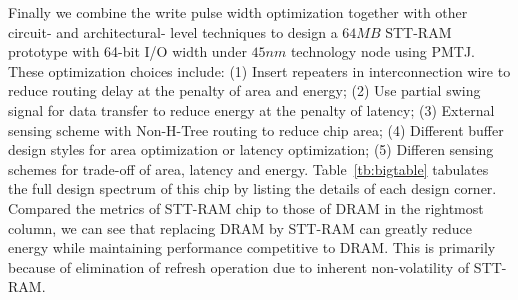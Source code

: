 Finally we combine the write pulse width optimization together with other circuit- and architectural- level techniques to design a $64MB$ STT-RAM prototype with 64-bit I/O width under $45nm$ technology node using PMTJ. These optimization choices include: (1) Insert repeaters in interconnection wire to reduce routing delay at the penalty of area and energy; (2) Use partial swing signal for data transfer to reduce energy at the penalty of latency; (3) External sensing scheme with Non-H-Tree routing to reduce chip area; (4) Different buffer design styles for area optimization or latency optimization; (5) Differen sensing schemes for trade-off of area, latency and energy. Table~\ref{tb:bigtable} tabulates the full design spectrum of this chip by listing the details of each design corner. Compared the metrics of STT-RAM chip to those of DRAM in the rightmost column, we can see that replacing DRAM by STT-RAM can greatly reduce energy while maintaining performance competitive to DRAM. This is primarily because of elimination of refresh operation due to inherent non-volatility of STT-RAM.

